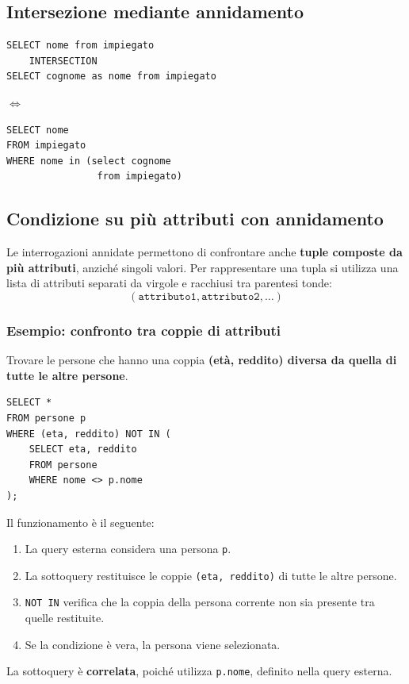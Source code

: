 \subsection{Intersezione mediante annidamento}
\begin{minipage}[c]{0.38\textwidth}
\footnotesize
\begin{verbatim}
SELECT nome from impiegato
    INTERSECTION
SELECT cognome as nome from impiegato 
\end{verbatim}
\end{minipage}
\hspace{0.3cm}
$\Longleftrightarrow$%
\hspace{0.3cm}
\begin{minipage}[c]{0.48\textwidth}
\begin{verbatim}
SELECT nome
FROM impiegato
WHERE nome in (select cognome 
                from impiegato)
\end{verbatim}
\end{minipage}

\subsection{Condizione su più attributi con annidamento}
Le interrogazioni annidate permettono di confrontare anche
\textbf{tuple composte da più attributi}, anziché singoli valori.
Per rappresentare una tupla si utilizza una lista di attributi
separati da virgole e racchiusi tra parentesi tonde:
\[
(\texttt{attributo1}, \texttt{attributo2}, \ldots)
\]
\subsubsection*{Esempio: confronto tra coppie di attributi}
Trovare le persone che hanno una coppia
\textbf{(età, reddito) diversa da quella di tutte le altre persone}.
\begin{verbatim}
SELECT *
FROM persone p
WHERE (eta, reddito) NOT IN (
    SELECT eta, reddito
    FROM persone
    WHERE nome <> p.nome
);
\end{verbatim}
Il funzionamento è il seguente:
\begin{enumerate}
    \item La query esterna considera una persona \texttt{p}.
    \item La sottoquery restituisce le coppie
    \texttt{(eta, reddito)} di tutte le altre persone.
    \item \texttt{NOT IN} verifica che la coppia della persona
    corrente non sia presente tra quelle restituite.
    \item Se la condizione è vera, la persona viene selezionata.
\end{enumerate}
La sottoquery è \textbf{correlata}, poiché utilizza
\texttt{p.nome}, definito nella query esterna.


